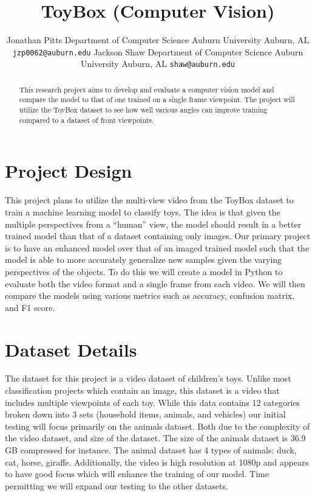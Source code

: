 \documentclass{article}
\title{ToyBox (Computer Vision)}
\author{%
  Jonathan Pitts 
  Department of Computer Science
  Auburn University
  Auburn, AL 
  \texttt{jzp0062@auburn.edu} 
  \And
  Jackson Shaw 
  Department of Computer Science 
  Auburn University 
  Auburn, AL 
  \texttt{shaw@auburn.edu}
}
\begin{document}
\nolinenumbers


\maketitle


\begin{abstract}
  This research project aims to develop and evaluate a computer vision model and compare the model to that of one trained on a single frame viewpoint. The project will utilize the ToyBox dataset to see how well various angles can improve training compared to a dataset of front viewpoints. 
\end{abstract}


\section{Project Design}


This project plans to utilize the multi-view video from the ToyBox dataset to train a machine learning model to classify toys. The idea is that given the multiple perspectives from a “human” view, the model should result in a better trained model than that of a dataset containing only images. Our primary project is to have an enhanced model over that of an imaged trained model such that the model is able to more accurately generalize new samples given the varying perspectives of the objects. To do this we will create a model in Python to evaluate both the video format and a single frame from each video. We will then compare the models using various metrics such as accuracy, confusion matrix, and F1 score.


\section{Dataset Details}


The dataset for this project is a video dataset of children’s toys. Unlike most classification projects which contain an image, this dataset is a video that includes multiple viewpoints of each toy. While this data contains 12 categories broken down into 3 sets (household items, animals, and vehicles) our initial testing will focus primarily on the animals dataset. Both due to the complexity of the video dataset, and size of the dataset. The size of the animals dataset is 36.9 GB compressed for instance. The animal dataset has 4 types of animals: duck, cat, horse, giraffe.  Additionally, the video is high resolution at 1080p and appears to have good focus which will enhance the training of our model. Time permitting we will expand our testing to the other datasets.
\end{document}
